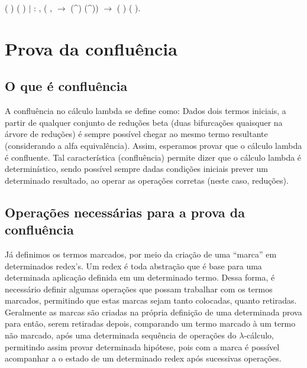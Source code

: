 \begin{coqdoccode}
\coqdocindent{15.50em}
  ( ) ( )\coqdoceol
\coqdocindent{1.00em}
\ensuremath{|}  : \coqdockw{\ensuremath{\forall}}   , (\coqdockw{\ensuremath{\forall}} ,    \ensuremath{\rightarrow}   (\^{}) (\^{})) \ensuremath{\rightarrow}\coqdoceol
\coqdocindent{15.50em}
  ( ) ( ).\coqdoceol
\coqdocemptyline
\end{coqdoccode}
\section{Prova da confluência}



\subsection{O que é confluência}



 A confluência no cálculo lambda se define como: Dados dois termos iniciais,
a partir de qualquer conjunto de reduções beta (duas bifurcações quaisquer na árvore de reduções)
 é sempre possível chegar ao mesmo termo resultante (considerando a alfa equivalência). 
Assim, esperamos provar que o cálculo lambda é confluente. Tal característica (confluência) 
permite dizer que o cálculo lambda é determinístico, sendo possível sempre dadas condições iniciais
prever um determinado resultado, ao operar as operações corretas (neste caso, reduções). 

\subsection{Operações necessárias para a prova da confluência}



 Já definimos os termos marcados, por meio da criação de uma ``marca'' em determinados redex's. Um
redex é toda abstração que é base para uma determinada aplicação definida em um determinado termo. Dessa forma, é
necessário definir algumas operações que possam trabalhar com os termos marcados, permitindo que estas marcas
sejam tanto colocadas, quanto retiradas. Geralmente as marcas são criadas na própria definição de uma determinada prova
para então, serem retiradas depois, comparando um termo marcado à um termo não marcado, após uma determinada
sequência de operações do $\lambda$-cálculo, permitindo assim provar determinada hipótese, pois com a marca
é possível acompanhar a o estado de um determinado redex após sucessivas operações. 

